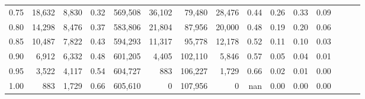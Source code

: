 \begin{tabular}{rrrrrrrrrrrrrrr}
0.75 &  18,632 &  8,830 &  0.32 &  569,508 &   36,102 &   79,480 &   28,476 &  0.44 &  0.26 &  0.33 &      0.09 \\
0.80 &  14,298 &  8,476 &  0.37 &  583,806 &   21,804 &   87,956 &   20,000 &  0.48 &  0.19 &  0.20 &      0.06 \\
0.85 &  10,487 &  7,822 &  0.43 &  594,293 &   11,317 &   95,778 &   12,178 &  0.52 &  0.11 &  0.10 &      0.03 \\
0.90 &   6,912 &  6,332 &  0.48 &  601,205 &    4,405 &  102,110 &    5,846 &  0.57 &  0.05 &  0.04 &      0.01 \\
0.95 &   3,522 &  4,117 &  0.54 &  604,727 &      883 &  106,227 &    1,729 &  0.66 &  0.02 &  0.01 &      0.00 \\
1.00 &     883 &  1,729 &  0.66 &  605,610 &        0 &  107,956 &        0 &   nan &  0.00 &  0.00 &      0.00 \\
\bottomrule
\end{tabular}
